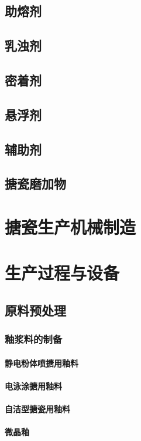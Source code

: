 \documentclass[UTF8]{../../ApplicationUniverse}
\begin{document}
    \subsection{助熔剂}
    \subsection{乳浊剂}
    \subsection{密着剂}
    \subsection{悬浮剂}
    \subsection{辅助剂}
    \subsection{搪瓷磨加物}
\section{搪瓷生产机械制造}
\section{生产过程与设备}
    \subsection{原料预处理}
        \subsubsection{釉浆料的制备}
            \paragraph{静电粉体喷搪用釉料}
            \paragraph{电泳涂搪用釉料}
            \paragraph{自洁型搪瓷用釉料}
            \paragraph{微晶釉}
\end{document}
